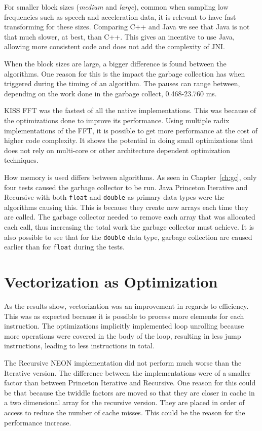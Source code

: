 For smaller block sizes (\emph{medium} and \emph{large}), common when sampling low frequencies such as speech and acceleration data, it is relevant to have fast transforming for these sizes. Comparing C++ and Java we see that Java is not that much slower, at best, than C++. This gives an incentive to use Java, allowing more consistent code and does not add the complexity of JNI.

When the block sizes are large, a bigger difference is found between the algorithms. One reason for this is the impact the garbage collection has when triggered during the timing of an algorithm. The pauses can range between, depending on the work done in the garbage collect, 0.468-23.760 ms.

KISS FFT was the fastest of all the native implementations. This was because of the optimizations done to improve its performance. Using multiple radix implementations of the FFT, it is possible to get more performance at the cost of higher code complexity. It shows the potential in doing small optimizations that does not rely on multi-core or other architecture dependent optimization techniques.

How memory is used differs between algorithms. As seen in Chapter~\ref{ch:gc}, only four tests caused the garbage collector to be run. Java Princeton Iterative and Recursive with both \texttt{float} and \texttt{double} as primary data types were the algorithms causing this. This is because they create new arrays each time they are called. The garbage collector needed to remove each array that was allocated each call, thus increasing the total work the garbage collector must achieve. It is also possible to see that for the \texttt{double} data type, garbage collection are caused earlier than for \texttt{float} during the tests.

\section{Vectorization as Optimization}

As the results show, vectorization was an improvement in regards to efficiency. This was as expected because it is possible to process more elements for each instruction. The optimizations implicitly implemented loop unrolling because more operations were covered in the body of the loop, resulting in less jump instructions, leading to less instructions in total.

The Recursive NEON implementation did not perform much worse than the Iterative version. The difference between the implementations were of a smaller factor than between Princeton Iterative and Recursive. One reason for this could be that because the twiddle factors are moved so that they are closer in cache in a two dimensional array for the recursive version. They are placed in order of access to reduce the number of cache misses. This could be the reason for the performance increase.

